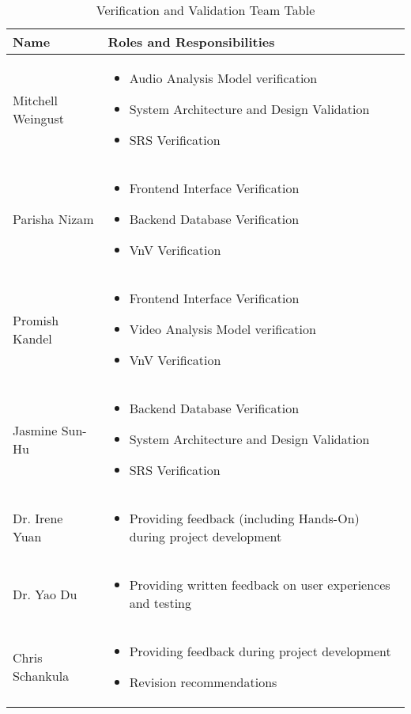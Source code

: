 \documentclass[12pt, titlepage]{article}
\begin{document}
\begin{table}[h!]
  \centering
  \begin{tabular}{ | m{5cm} | m{8cm} | }
    \toprule
    Name & Roles and Responsibilities \\
    \hline
    Mitchell Weingust & \begin{itemize}
      \item Audio Analysis Model verification
      \item System Architecture and Design Validation
      \item SRS Verification
    \end{itemize}\\
    \hline
    Parisha Nizam & \begin{itemize}
      \item Frontend Interface Verification
      \item Backend Database Verification
      \item VnV Verification
    \end{itemize}\\
    \hline
    Promish Kandel & \begin{itemize}
      \item Frontend Interface Verification
      \item Video Analysis Model verification
      \item VnV Verification
    \end{itemize}\\
    \hline
    Jasmine Sun-Hu & \begin{itemize}
      \item Backend Database Verification
      \item System Architecture and Design Validation
      \item SRS Verification
    \end{itemize}\\
    \hline
    Dr. Irene Yuan & \begin{itemize}
      \item Providing feedback (including Hands-On) during project development
    \end{itemize}\\
    \hline
    Dr. Yao Du & \begin{itemize}
      \item Providing written feedback on user experiences and testing
    \end{itemize}\\
    \hline
    Chris Schankula & \begin{itemize}
      \item Providing feedback during project development
      \item Revision recommendations
    \end{itemize}\\
    \bottomrule
  \end{tabular}
  \caption{Verification and Validation Team Table}
\end{table}
\end{document}
